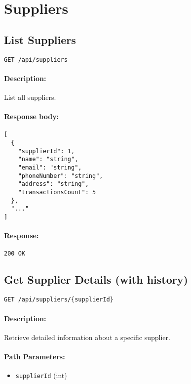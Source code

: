 \documentclass[a4paper,11pt]{article}
\begin{document}
\section{Suppliers}
\label{sec:suppliers}

\subsection{List Suppliers}
\label{sec:suppliers-all}
\begin{verbatim}
GET /api/suppliers
\end{verbatim}
\paragraph{Description:} List all suppliers.
\paragraph{Response body:}
\begin{verbatim}
[
  {
    "supplierId": 1,
    "name": "string",
    "email": "string",
    "phoneNumber": "string",
    "address": "string",
    "transactionsCount": 5
  },
  "..."
]
\end{verbatim}
\paragraph{Response:} \texttt{200 OK}

\subsection{Get Supplier Details (with history)}
\label{sec:suppliers-details}
\begin{verbatim}
GET /api/suppliers/{supplierId}
\end{verbatim}
\paragraph{Description:} Retrieve detailed information about a specific supplier.
\paragraph{Path Parameters:}
\begin{itemize}
  \item \texttt{supplierId} (int)
\end{itemize}
\end{document}
